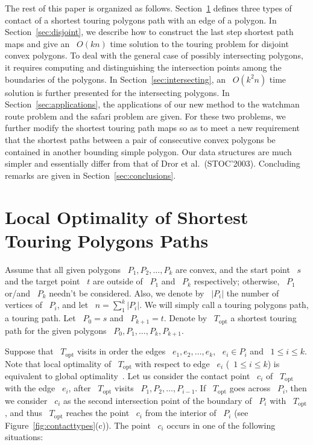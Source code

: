 \documentclass[11pt]{article}
\begin{document}
The rest of this paper is organized as follows.
Section~\ref{sec:local-optimality} defines three types of contact of a shortest touring polygons path with an edge of a polygon.
In Section~\ref{sec:disjoint}, we describe how to construct the last step shortest path maps and give an ~\(O(kn)\) time solution to the touring problem for disjoint convex polygons.
To deal with the general case of possibly intersecting polygons, it requires computing and distinguishing the intersection points among the boundaries of the polygons.
In Section~\ref{sec:intersecting}, an ~\(O(k^2n)\) time solution is further presented for the intersecting polygons.
In Section~\ref{sec:applications}, the applications of our new method to the watchman route problem and the safari problem are given.
For these two problems, we further modify the shortest touring path maps so as to meet a new requirement that the shortest paths between a pair of consecutive convex polygons be contained in another bounding simple polygon.
Our data structures are much simpler and essentially differ from that of Dror et al.\ (STOC'2003).
Concluding remarks are given in Section~\ref{sec:conclusions}.

\section{Local Optimality of Shortest Touring Polygons Paths}
\label{sec:local-optimality}

Assume that all given polygons ~\(P_1, P_2, \ldots, P_k\) are convex, and the start point ~\(s\) and the target point ~\(t\) are outside of ~\(P_1\) and ~\(P_k\) respectively; otherwise, ~\(P_1\) or/and ~\(P_k\) needn't be considered.
Also, we denote by ~\(|P_i|\) the number of vertices of ~\(P_i\), and let ~\(n = \sum_1^k |P_i|\).
We will simply call a touring polygons path, a touring path.
Let ~\(P_0 = s\) and ~\(P_{k+1} = t\).
Denote by ~\(T_{\mathrm{opt}}\) a shortest touring path for the given polygons ~\(P_0, P_1, \ldots, P_k, P_{k+1}\).

Suppose that ~\(T_{\mathrm{opt}}\) visits in order the edges ~\(e_1, e_2, \ldots, e_k\), ~\(e_i \in P_i\) and ~\(1 \le i \le k\).
Note that local optimality of ~\(T_{\mathrm{opt}}\) with respect to edge ~\(e_i\) (~\(1 \le i \le k\)) is equivalent to global optimality~\cite{ref6,ref12}.
Let us consider the contact point ~\(c_i\) of ~\(T_{\mathrm{opt}}\) with the edge ~\(e_i\), after ~\(T_{\mathrm{opt}}\) visits ~\(P_1, P_2, \ldots, P_{i-1}\).
If ~\(T_{\mathrm{opt}}\) goes across ~\(P_i\), then we consider ~\(c_i\) as the second intersection point of the boundary of ~\(P_i\) with ~\(T_{\mathrm{opt}}\), and thus ~\(T_{\mathrm{opt}}\) reaches the point ~\(c_i\) from the interior of ~\(P_i\) (see Figure~\ref{fig:contacttypes}(c)).
The point ~\(c_i\) occurs in one of the following situations:
\end{document}
